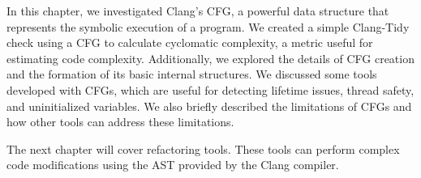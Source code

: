 In this chapter, we investigated Clang's CFG, a powerful data structure that represents the symbolic execution of a program. We created a simple Clang-Tidy check using a CFG to calculate cyclomatic complexity, a metric useful for estimating code complexity. Additionally, we explored the details of CFG creation and the formation of its basic internal structures. We discussed some tools developed with CFGs, which are useful for detecting lifetime issues, thread safety, and uninitialized variables. We also briefly described the limitations of CFGs and how other tools can address these limitations.

The next chapter will cover refactoring tools. These tools can perform complex code modifications using the AST provided by the Clang compiler.
